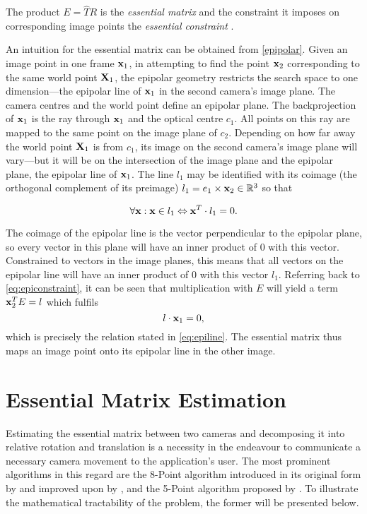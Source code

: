 The product $E=\widehat{T}R$ is the \emph{essential matrix} and the constraint it
imposes on corresponding image points the \emph{essential constraint}
\citep[see][chapter 5]{ma2003}. 

An intuition for the essential matrix can be
obtained from \autoref{epipolar}. Given an image point in one frame $\mathbf{x}_1$,
in attempting to find the point $\mathbf{x}_2$ corresponding to the same world
point $\mathbf{X}_1$, the epipolar geometry restricts the search space to one
dimension---the epipolar line of $\mathbf{x}_1$ in the second camera's image plane.
The camera centres and the world point define an epipolar plane. The
backprojection of $\mathbf{x}_1$ is the ray through $\mathbf{x}_1$ and the optical
centre $c_1$. All points on this ray are mapped to the same point on the image
plane of $c_2$. Depending on how far away the world point $\mathbf{X}_1$ is from $c_1$, its
image on the second camera's image plane will vary---but it will be on the
intersection of the image plane and the epipolar plane, the epipolar line of
$\mathbf{x}_1$. The line $l_1$ may be identified with its coimage (the orthogonal
complement of its preimage) $l_1 = e_1 \times \mathbf{x}_2 \in \mathbb{R}^3$ so that

\begin{equation} \label{eq:epiline}
   \forall\mathbf{x}: \mathbf{x}\in l_1 \Leftrightarrow \mathbf{x}^T\cdot l_1 = 0.
\end{equation} 

The coimage of the epipolar line is the vector perpendicular to the epipolar plane,
so every vector in this plane will have an inner product of $0$ with this
vector. Constrained to vectors in the image planes, this means that all vectors on the
epipolar line will have an inner product of $0$ with this vector $l_1$.
Referring back to \eqref{eq:epiconstraint}, it can be seen that multiplication
with $E$ will yield a term $\mathbf{x}_2^TE = l$ which fulfils 
\begin{equation}
   l \cdot \mathbf{x}_1 = 0,
\end{equation}
which is precisely the relation stated in \eqref{eq:epiline}. The essential
matrix thus maps an image point onto its epipolar line in the other image.

\section{Essential Matrix Estimation}

Estimating the essential matrix between two
cameras and decomposing it into relative rotation and translation is a necessity
in the endeavour to communicate a necessary camera movement to the application's
user. The most prominent algorithms in this regard are the 8-Point algorithm
introduced in its original form by \citet{longuet-higgins1987} and improved upon
by \citet{hartley1997}, and the 5-Point algorithm proposed by
\citet{nister2004}. To illustrate the mathematical tractability of the problem,
the former will be presented below.

